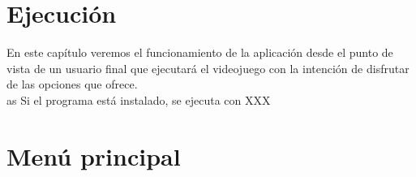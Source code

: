 



\section{Ejecución}

En este capítulo veremos el funcionamiento de la aplicación desde el punto de vista de un usuario final que ejecutará el
videojuego con la intención de disfrutar de las opciones que ofrece. \\



as Si el programa está instalado, se ejecuta con XXX

\section{Menú principal}



